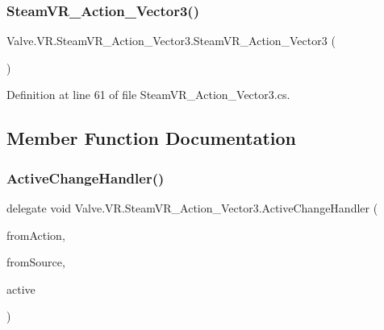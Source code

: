 \subsubsection{\texorpdfstring{SteamVR\_Action\_Vector3()}{SteamVR\_Action\_Vector3()}}
{\footnotesize\ttfamily Valve.\+V\+R.\+Steam\+V\+R\+\_\+\+Action\+\_\+\+Vector3.\+Steam\+V\+R\+\_\+\+Action\+\_\+\+Vector3 (\begin{DoxyParamCaption}{ }\end{DoxyParamCaption})}



Definition at line 61 of file Steam\+V\+R\+\_\+\+Action\+\_\+\+Vector3.\+cs.



\subsection{Member Function Documentation}
\mbox{\label{class_valve_1_1_v_r_1_1_steam_v_r___action___vector3_a47d6c1c558fb45841cd626df9ab3dcb9}} 
\subsubsection{\texorpdfstring{ActiveChangeHandler()}{ActiveChangeHandler()}}
{\footnotesize\ttfamily delegate void Valve.\+V\+R.\+Steam\+V\+R\+\_\+\+Action\+\_\+\+Vector3.\+Active\+Change\+Handler (\begin{DoxyParamCaption}\item[{\mbox{\hyperlink{class_valve_1_1_v_r_1_1_steam_v_r___action___vector3}{Steam\+V\+R\+\_\+\+Action\+\_\+\+Vector3}}}]{from\+Action,  }\item[{\mbox{\hyperlink{namespace_valve_1_1_v_r_a82e5bf501cc3aa155444ee3f0662853f}{Steam\+V\+R\+\_\+\+Input\+\_\+\+Sources}}}]{from\+Source,  }\item[{bool}]{active }\end{DoxyParamCaption})}

\mbox{\label{class_valve_1_1_v_r_1_1_steam_v_r___action___vector3_ab615db1dda35e5faadf620c2ecf57c4c}} 
